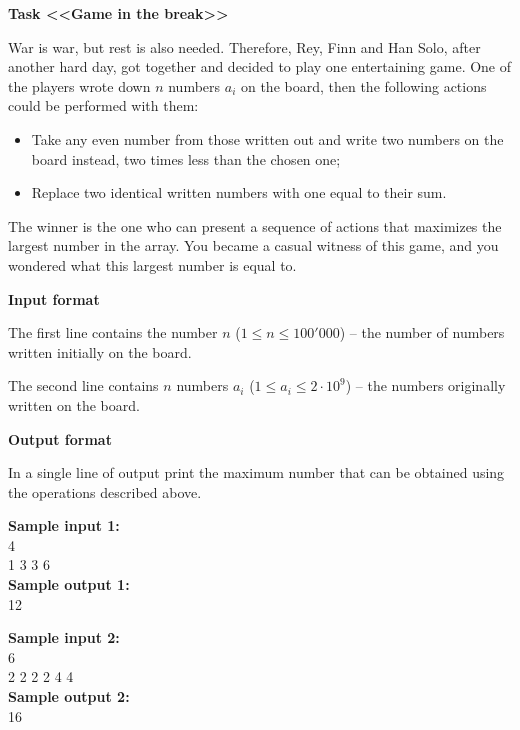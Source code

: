 \documentclass[a4paper]{article}
\begin{document}
\textbf{Task <<Game in the break>>}

\SPACE

War is war, but rest is also needed. Therefore, Rey, Finn and Han Solo, after another hard day, got together and decided to play one entertaining game. One of the players wrote down $n$ numbers $a_i$ on the board, then the following actions could be performed with them:
\begin{itemize}
\item Take any even number from those written out and write two numbers on the board instead, two times less than the chosen one;
\item Replace two identical written numbers with one equal to their sum.
\end{itemize}

The winner is the one who can present a sequence of actions that maximizes the largest number in the array. You became a casual witness of this game, and you wondered what this largest number is equal to.

\SPACE

\textbf{Input format}

The first line contains the number $n$ ($1 \le n \le 100'000$) -- the number of numbers written initially on the board.

The second line contains $n$ numbers $a_i$ ($1 \le a_i \le 2 \cdot 10^9$) -- the numbers originally written on the board.

\SPACE

\textbf{Output format}

In a single line of output print the maximum number that can be obtained using the operations described above.

\LINE

\noindent \textbf{Sample input 1:}\\
4\\
1 3 3 6\\


\noindent \textbf{Sample output 1:}\\
12\\

\SPACE

\noindent \textbf{Sample input 2:}\\
6\\
2 2 2 2 4 4\\


\noindent \textbf{Sample output 2:}\\
16\\
\end{document}
